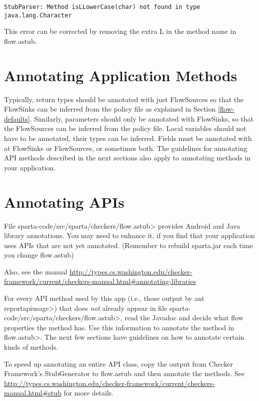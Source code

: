 \begin{Verbatim}
StubParser: Method isLLowerCase(char) not found in type java.lang.Character
\end{Verbatim}
This error can be corrected by removing the extra L in the method name in flow.astub.

\section{Annotating Application Methods}

Typically, return types should be annotated with just FlowSources so that the FlowSinks can be inferred from the policy file as explained in Section \ref{flow-defaults}.
Similarly, parameters should only be annotated with FlowSinks, so that the FlowSources can be inferred from  the policy file.  Local variables should not have to be annotated, their types can be inferred. Fields must be annotated with at FlowSinks or FlowSources, or sometimes both. 
The guidelines for annotating API methods described in the next sections also apply to annotating methods in your application. 


\section{Annotating APIs\label{sec:annotatedAPI}}

File \<sparta-code/src/sparta/checkers/flow.astub> provides Android and Java
library annotations.  You may need to enhance it, if you find that your application
uses APIs that are not yet annotated.  (Remember to rebuild sparta.jar each time you change flow.astub)

Also, see the manual 
\url{http://types.cs.washington.edu/checker-framework/current/checkers-manual.html#annotating-libraries}

For every API method used by this app (i.e., those output by \<ant
reportapiusage>) that does \emph{not} already appear in file
\<sparta-code/src/sparta/checkers/flow.astub>, read the Javadoc and decide what flow properties the method
has.  Use this information to annotate the method in \<flow.astub>.  The next few sections have guidelines on
how to annotate certain kinds of methods. 

To speed up annotating an entire API class, copy the output from Checker Framework's StubGenerator to 
flow.astub and then annotate the methods.  See \url{http://types.cs.washington.edu/checker-framework/current/checkers-manual.html#stub} for more details. 

